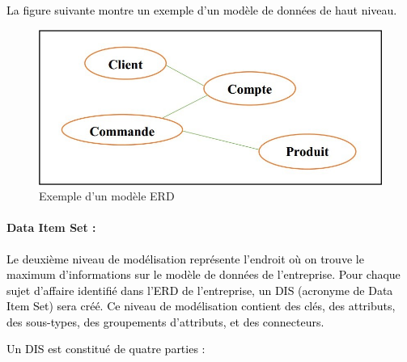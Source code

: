 \documentclass[a4paper,12pt]{report}
\begin{document}
\textcolor{black}{La figure suivante montre un exemple d’un modèle de données de haut niveau.}


\begin{figure}[H]
\begin{center}
\includegraphics[width=0.5\linewidth]{./images/4}
\end{center}

\caption{Exemple d'un modèle ERD}
\label{fig:4}

\end{figure}

\paragraph{Data Item Set : }

\textcolor{black}{Le deuxième niveau de modélisation représente l’endroit où on trouve le maximum d’informations sur le modèle de données de l’entreprise. Pour chaque sujet d’affaire identifié dans l’ERD de l’entreprise, un DIS (acronyme de Data Item Set) sera créé. Ce niveau de modélisation contient des clés, des attributs, des sous-types, des groupements d’attributs, et des connecteurs.}

\textcolor{black}{Un DIS est constitué de quatre parties :}
\end{document}
